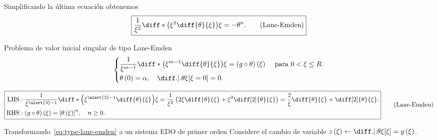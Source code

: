 \begin{frame}
    Simplificando la última ecuación obtenemos
    \begin{equation}
        \boxed{
            \frac{1}{\xi^{2}}
            \diff*{\left(\xi^{2}\diff{\theta}{\xi}\right)}{\xi}=
            -\theta^{n}.\tag{Lane-Emden}
        }\label{eq:Lane-Emden}
    \end{equation}
    \begin{block}{Problema de valor inicial singular de tipo Lane-Emden}
        \begin{equation}\label{eq:type-lane-emden}
            \begin{cases}\displaystyle
                \frac{1}{\xi^{m-1}}
                \diff*{\left(\xi^{m-1}\diff{\theta}{\xi}\right)}{\xi}=
                \left(g\circ\theta\right)\left(\xi\right)
                 & \text { para }0<\xi\leq R. \\[2mm]\displaystyle
                \theta\left(0\right)=
                \alpha,\quad
                \diff.|.{\theta}{\xi}[\xi=0]=
                0.
                 &
            \end{cases}
        \end{equation}
    \end{block}

    \vspace*{-2\baselineskip}\setlength\belowdisplayshortskip{0pt}
    \begin{equation}
        \boxed{
            \begin{aligned}
                \text{LHS} & :
                \frac{1}{\xi^{\alert{3}-1}}
                \diff*{\left(\xi^{\alert{3}-1}\diff{\theta}{\xi}\right)}{\xi}=
                \frac{1}{\xi^{2}}
                \left(
                2\xi\diff{\theta}{\xi}+
                \xi^{2}\diff[2]{\theta}{\xi}
                \right)=
                \frac{2}{\xi}
                \diff{\theta}{\xi}+
                \diff[2]{\theta}{\xi}. \\
                \text{RHS} & :
                \left(g\circ\theta\right)
                \left(\xi\right)=
                {\left[\theta\left(\xi\right)\right]}^{n},\quad
                n\geq 0.
            \end{aligned}
        }\tag{Lane-Emden}
    \end{equation}

    \begin{block}{Transformando~\eqref{eq:type-lane-emden} a un sistema EDO de primer orden}
        Considere el cambio de variable
        \begin{math}
            z\left(\xi\right)\leftarrow
            \diff.|.{\theta}{\xi}[\xi]=
            y\left(\xi\right)
        \end{math}.
    \end{block}


\end{frame}
